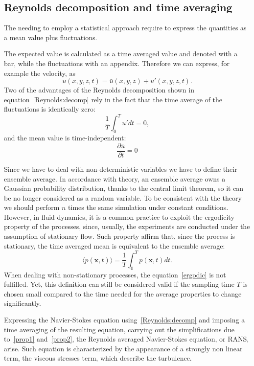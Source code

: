   


\subsection{Reynolds decomposition and time averaging}
The needing to employ a statistical approach require to express the quantities as a mean value plus fluctuations.\par
The expected value is calculated as a time averaged value and denoted with a bar, while the fluctuations with an appendix. Therefore we can express, for example the velocity, as
\begin{equation}
u(x,y,z,t) = \bar{u}(x,y,z) + u'(x,y,z,t).
\label{Reynolds:decomp}
\end{equation}
Two of the advantages of the Reynolds decomposition shown in equation~\ref{Reynolds:decomp} rely in the fact that the time average of the fluctuations is identically zero:
\begin{equation}
\frac{1}{T} \int_{0}^{T} u' dt =0,
\label{prop1}
\end{equation}
and the mean value is time-independent:
\begin{equation}
\frac{\partial \bar{u} }{\partial t} = 0
\label{prop2}
\end{equation}
\par
Since we have to deal with non-deterministic variables we have to define their ensemble average. In accordance with theory, an ensemble average owns a Gaussian probability distribution, thanks to the central limit theorem, so it can be no longer considered as a random variable. To be consistent with the theory we should perform $n$ times the same simulation under constant conditions.
However, in fluid dynamics, it is a common practice to exploit the ergodicity property of the processes, since, usually, the experiments are conducted under the assumption of stationary flow. 
Such property affirm that, since the process is stationary, the time averaged mean is equivalent to the ensemble average:
\begin{equation}
\langle p(\mathbf{x},t) \rangle = \frac{1}{T} \int_{0}^{T} p(\mathbf{x},t) dt.
\label{ergodic}
\end{equation}
When dealing with non-stationary processes, the equation~\ref{ergodic} is not fulfilled. Yet, this definition can still be considered valid if the sampling time $T$ is chosen small compared to the time needed for the average properties to change significantly.
\par
Expressing the Navier-Stokes equation using~\ref{Reynolds:decomp} and imposing a time averaging of the resulting equation, carrying out the simplifications due to~\ref{prop1} and~\ref{prop2}, the Reynolds averaged Navier-Stokes equation, or RANS, arise. Such equation is characterized by the appearance of a strongly non linear term, the viscous stresses term, which describe the turbulence.
